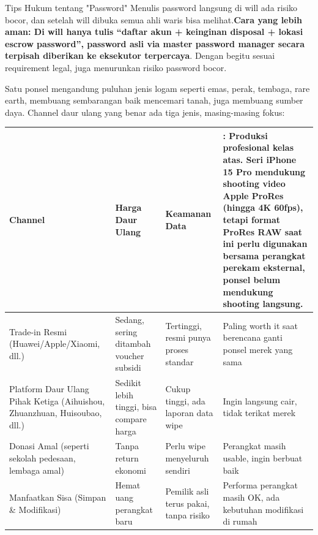 \begin{tcbwarn}{Tips Hukum tentang "Password"}
Menulis password langsung di will ada risiko bocor, dan setelah will dibuka semua ahli waris bisa melihat.\textbf{Cara yang lebih aman: Di will hanya tulis “daftar akun + keinginan disposal + lokasi escrow password”, password asli via master password manager secara terpisah diberikan ke eksekutor terpercaya}. Dengan begitu sesuai requirement legal, juga menurunkan risiko password bocor.

\end{tcbwarn}


Satu ponsel mengandung puluhan jenis logam seperti emas, perak, tembaga, rare earth, membuang sembarangan baik mencemari tanah, juga membuang sumber daya. Channel daur ulang yang benar ada tiga jenis, masing-masing fokus:

\begin{center}
\begin{tabularx}{\linewidth}{|X|X|X|X|}
\hline
\textbf{Channel} & \textbf{Harga Daur Ulang} & \textbf{Keamanan Data} & \textbf{: Produksi profesional kelas atas. Seri iPhone 15 Pro mendukung shooting video Apple ProRes (hingga 4K 60fps), tetapi format ProRes RAW saat ini perlu digunakan bersama perangkat perekam eksternal, ponsel belum mendukung shooting langsung.} \tabularnewline
\hline
Trade-in Resmi (Huawei/Apple/Xiaomi, dll.) & Sedang, sering ditambah voucher subsidi & Tertinggi, resmi punya proses standar & Paling worth it saat berencana ganti ponsel merek yang sama \tabularnewline
Platform Daur Ulang Pihak Ketiga (Aihuishou, Zhuanzhuan, Huisoubao, dll.) & Sedikit lebih tinggi, bisa compare harga & Cukup tinggi, ada laporan data wipe & Ingin langsung cair, tidak terikat merek \tabularnewline
Donasi Amal (seperti sekolah pedesaan, lembaga amal) & Tanpa return ekonomi & Perlu wipe menyeluruh sendiri & Perangkat masih usable, ingin berbuat baik \tabularnewline
Manfaatkan Sisa (Simpan \& Modifikasi) & Hemat uang perangkat baru & Pemilik asli terus pakai, tanpa risiko & Performa perangkat masih OK, ada kebutuhan modifikasi di rumah \tabularnewline
\hline
\end{tabularx}
\end{center}

